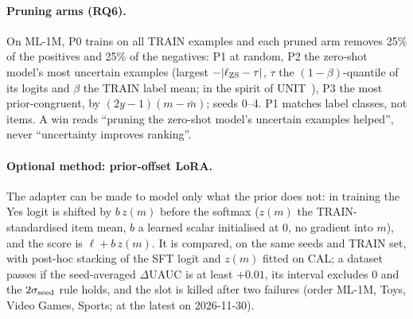 \paragraph{Pruning arms (RQ6).}
On ML-1M, P0 trains on all TRAIN examples and each pruned arm removes 25\% of the positives and 25\% of the negatives: P1 at random,
P2 the zero-shot model's most uncertain examples (largest $-|\ell_{\rm ZS}-\tau|$, $\tau$ the $(1-\beta)$-quantile of its logits and
$\beta$ the TRAIN label mean; in the spirit of UNIT~\citep{wu2025unit}), P3 the most prior-congruent, by $(2y-1)(m-\bar m)$; seeds 0--4.
P1 matches label classes, not items. A win reads ``pruning the zero-shot model's uncertain examples helped'', never ``uncertainty
improves ranking''.

\paragraph{Optional method: prior-offset LoRA.}\label{sec:slot}
The adapter can be made to model only what the prior does not: in training the Yes logit is shifted by $b\,z(m)$ before the softmax
($z(m)$ the TRAIN-standardised item mean, $b$ a learned scalar initialised at 0, no gradient into $m$), and the score is
$\ell+b\,z(m)$. It is compared, on the same seeds and TRAIN set, with post-hoc stacking of the SFT logit and $z(m)$ fitted on CAL; a
dataset passes if the seed-averaged $\Delta$UAUC is at least $+0.01$, its interval excludes 0 and the $2\sigma_{\rm seed}$ rule holds,
and the slot is killed after two failures (order ML-1M, Toys, Video Games, Sports; at the latest on 2026-11-30).
